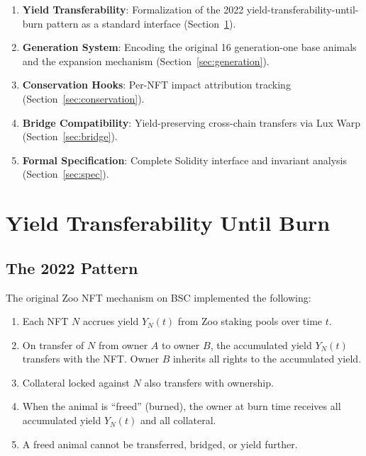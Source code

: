\documentclass[11pt,letterpaper]{article}
\begin{document}
\begin{enumerate}
    \item \textbf{Yield Transferability}: Formalization of the 2022 yield-transferability-until-burn pattern as a standard interface (Section~\ref{sec:yield}).

    \item \textbf{Generation System}: Encoding the original 16 generation-one base animals and the expansion mechanism (Section~\ref{sec:generation}).

    \item \textbf{Conservation Hooks}: Per-NFT impact attribution tracking (Section~\ref{sec:conservation}).

    \item \textbf{Bridge Compatibility}: Yield-preserving cross-chain transfers via Lux Warp (Section~\ref{sec:bridge}).

    \item \textbf{Formal Specification}: Complete Solidity interface and invariant analysis (Section~\ref{sec:spec}).
\end{enumerate}

\section{Yield Transferability Until Burn}
\label{sec:yield}

\subsection{The 2022 Pattern}

The original Zoo NFT mechanism on BSC implemented the following:

\begin{enumerate}
    \item Each NFT $N$ accrues yield $Y_N(t)$ from Zoo staking pools over time $t$.
    \item On transfer of $N$ from owner $A$ to owner $B$, the accumulated yield $Y_N(t)$ transfers with the NFT. Owner $B$ inherits all rights to the accumulated yield.
    \item Collateral locked against $N$ also transfers with ownership.
    \item When the animal is ``freed'' (burned), the owner at burn time receives all accumulated yield $Y_N(t)$ and all collateral.
    \item A freed animal cannot be transferred, bridged, or yield further.
\end{enumerate}
\end{document}
